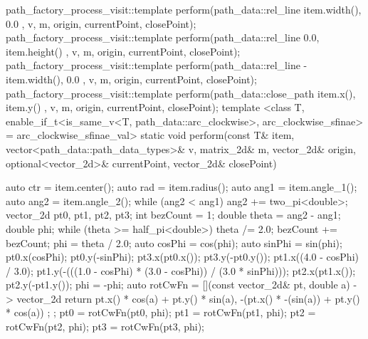\begin{codeblock}
{{{        path_factory_process_visit::template perform(path_data::rel_line{ { item.width(), 0.0 } }, v, m, origin, currentPoint, closePoint);
        path_factory_process_visit::template perform(path_data::rel_line{ { 0.0, item.height() } }, v, m, origin, currentPoint, closePoint);
        path_factory_process_visit::template perform(path_data::rel_line{ { -item.width(), 0.0 } }, v, m, origin, currentPoint, closePoint);
        path_factory_process_visit::template perform(path_data::close_path{ { item.x(), item.y() } }, v, m, origin, currentPoint, closePoint);
      }
      template <class T, enable_if_t<is_same_v<T, path_data::arc_clockwise>, arc_clockwise_sfinae> = arc_clockwise_sfinae_val>
      static void perform(const T& item, vector<path_data::path_data_types>& v, matrix_2d& m, vector_2d& origin, optional<vector_2d>& currentPoint, vector_2d& closePoint) {
        {
          auto ctr = item.center();
          auto rad = item.radius();
          auto ang1 = item.angle_1();
          auto ang2 = item.angle_2();
          while (ang2 < ang1) {
            ang2 += two_pi<double>;
          }
          vector_2d pt0, pt1, pt2, pt3;
          int bezCount = 1;
          double theta = ang2 - ang1;
          double phi{};
          while (theta >= half_pi<double>) {
            theta /= 2.0;
            bezCount += bezCount;
          }
          phi = theta / 2.0;
          auto cosPhi = cos(phi);
          auto sinPhi = sin(phi);
          pt0.x(cosPhi);
          pt0.y(-sinPhi);
          pt3.x(pt0.x());
          pt3.y(-pt0.y());
          pt1.x((4.0 - cosPhi) / 3.0);
          pt1.y(-(((1.0 - cosPhi) * (3.0 - cosPhi)) / (3.0 * sinPhi)));
          pt2.x(pt1.x());
          pt2.y(-pt1.y());
          phi = -phi;
          auto rotCwFn = [](const vector_2d& pt, double a) -> vector_2d {
            return { pt.x() * cos(a) + pt.y() * sin(a),
              -(pt.x() * -(sin(a)) + pt.y() * cos(a)) };
          };
          pt0 = rotCwFn(pt0, phi);
          pt1 = rotCwFn(pt1, phi);
          pt2 = rotCwFn(pt2, phi);
          pt3 = rotCwFn(pt3, phi);
  
}}}}
\end{codeblock}
